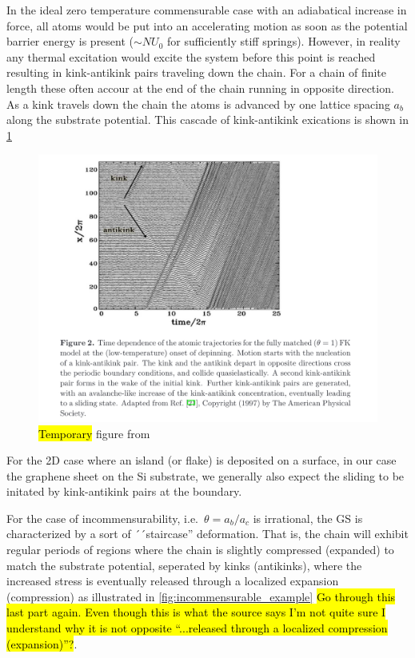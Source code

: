 In the ideal zero temperature commensurable case with an adiabatical increase in force, all atoms would be put into an accelerating motion as soon as the potential barrier energy is present ($\sim NU_0$ for sufficiently stiff springs). However, in reality any thermal excitation would excite the system before this point is reached resulting in kink-antikink pairs traveling down the chain. For a chain of finite length these often accour at the end of the chain running in opposite direction. As a kink travels down the chain the atoms is advanced by one lattice spacing $a_b$ along the substrate potential. This cascade of kink-antikink exications is shown in \cref{fig:kink_antikink}

\begin{figure}[H]
  \centering
  \includegraphics[width=0.8\linewidth]{figures/theory/kink_antikink.png}
  \caption{\hl{Temporary} figure from \cite{Manini_2016}}
  \label{fig:kink_antikink}
\end{figure}

For the 2D case where an island (or flake) is deposited on a surface, in our case the graphene sheet on the Si substrate, we generally also expect the sliding to be initated by kink-antikink pairs at the boundary. 

For the case of incommensurability, i.e.\ $\theta = a_b/a_c$ is irrational, the
GS is characterized by a sort of ´´staircase'' deformation. That is, the chain
will exhibit regular periods of regions where the chain is slightly compressed
(expanded) to match the substrate potential, seperated by kinks (antikinks),
where the increased stress is eventually released through a localized expansion
(compression) as illustrated in \cref{fig:incommensurable_example} \hl{Go through this last part  again. Even though this is what the source says I'm not quite sure I understand why it is not opposite ``...released through a localized compression (expansion)''?}.

